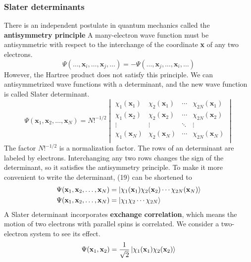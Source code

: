 \documentclass[11pt]{article}
\begin{document}
\subsubsection{Slater determinants}
There is an independent postulate in quantum mechanics called the \textbf{antisymmetry principle}
A many-electron wave function must be antisymmetric with respect to the interchange of
the coordinate \textbf{x} of any two electrons.
\begin{equation}
    \Psi(\ldots,\mathbf{x}_i,\ldots,\mathbf{x}_j,\ldots)=-\Psi(\ldots,\mathbf{x}_j,\ldots,\mathbf{x}_i,\ldots)
\end{equation}
However, the Hartree product does not satisfy this principle. We can antisymmetrized wave functions with
a determinant, and the new wave function is called Slater determinant.
\begin{equation}
    \Psi(\mathbf{x}_1,\mathbf{x}_2,\ldots,\mathbf{x}_N)={N!}^{-1/2}
    \begin{vmatrix}
        \chi_1(\mathbf{x}_1) & \chi_2(\mathbf{x}_1) & \cdots & \chi_{2N}(\mathbf{x}_1)\\
        \chi_1(\mathbf{x}_2) & \chi_2(\mathbf{x}_2) & \cdots & \chi_{2N}(\mathbf{x}_2)\\
        \vdots & \vdots & \ddots & \vdots\\
        \chi_1(\mathbf{x}_N) & \chi_2(\mathbf{x}_N) & \cdots & \chi_{2N}(\mathbf{x}_N)\\
    \end{vmatrix}        
\end{equation}
The factor ${N!}^{-1/2}$ is a normalization factor. The rows of an determinant are labeled
by electrons. Interchanging any two rows changes the sign of the determinant, so it satisfies 
the antisymmetry principle. To make it more convenient to write the determinant, (19)
can be shortened to
\begin{align}
    \Psi(\mathbf{x}_1,\mathbf{x}_2,\ldots,\mathbf{x}_N)&=\ket{\chi_1(\mathbf{x}_1)\chi_2(\mathbf{x}_2)\cdots\chi_{2N}(\mathbf{x}_N)}\\ 
    \Psi(\mathbf{x}_1,\mathbf{x}_2,\ldots,\mathbf{x}_N)&=\ket{\chi_1\chi_2\cdots\chi_{2N}}
\end{align}
A Slater determinant incorporates \textbf{exchange correlation}, which means the motion of two
electrons with parallel spins is correlated. We consider a two-electron system to see its effect.
\begin{equation}
    \Psi(\mathbf{x}_1,\mathbf{x}_2)=\frac{1}{\sqrt{2}}\ket{\chi_1(\mathbf{x}_1)\chi_2(\mathbf{x}_2)}
\end{equation}
\end{document}
